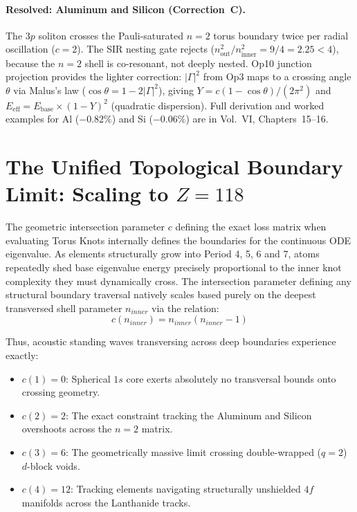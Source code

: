 \paragraph{Resolved: Aluminum and Silicon (Correction~C).}
The $3p$ soliton crosses the Pauli-saturated $n = 2$ torus boundary twice per radial oscillation ($c = 2$).  The SIR nesting gate rejects ($n_\text{out}^2/n_\text{inner}^2 = 9/4 = 2.25 < 4$), because the $n = 2$ shell is co-resonant, not deeply nested.  Op10 junction projection provides the lighter correction: $|\Gamma|^2$ from Op3 maps to a crossing angle $\theta$ via Malus's law ($\cos\theta = 1 - 2|\Gamma|^2$), giving $Y = c(1-\cos\theta)/(2\pi^2)$ and $E_\text{eff} = E_\text{base} \times (1-Y)^2$ (quadratic dispersion).  Full derivation and worked examples for Al ($-0.82\%$) and Si ($-0.06\%$) are in Vol.~VI, Chapters~15--16.

\section{The Unified Topological Boundary Limit: Scaling to $Z=118$}
\label{sec:topo_tori_unification}

The geometric intersection parameter $c$ defining the exact loss matrix when evaluating Torus Knots internally defines the boundaries for the continuous ODE eigenvalue. As elements structurally grow into Period 4, 5, 6 and 7, atoms repeatedly shed base eigenvalue energy precisely proportional to the inner knot complexity they must dynamically cross. The intersection parameter defining any structural boundary traversal natively scales based purely on the deepest transversed shell parameter $n_{inner}$ via the relation:
\begin{equation}
    c(n_{inner}) = n_{inner} (n_{inner} - 1)
\end{equation}

Thus, acoustic standing waves transversing across deep boundaries experience exactly:
\begin{itemize}
    \item $c(1) = 0$: Spherical $1s$ core exerts absolutely no transversal bounds onto crossing geometry.
    \item $c(2) = 2$: The exact constraint tracking the Aluminum and Silicon overshoots across the $n=2$ matrix.
    \item $c(3) = 6$: The geometrically massive limit crossing double-wrapped ($q=2$) $d$-block voids.
    \item $c(4) = 12$: Tracking elements navigating structurally unshielded $4f$ manifolds across the Lanthanide tracks.
\end{itemize}

